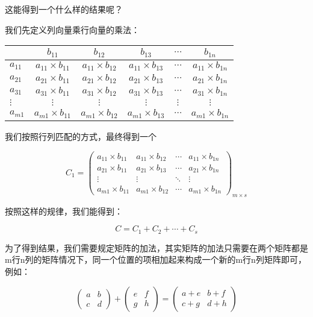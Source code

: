 \documentclass[12.8pt,a4paper,numbering = AMSalpha]{book}
\begin{document}
这能得到一个什么样的结果呢？

我们先定义列向量乘行向量的乘法：

\begin{center}
	\begin{tabular}{|l|c|c|c|c|c|}
		\hline
		\textbf{} & \textbf{$b_{11}$} & \textbf{$b_{12}$} & \textbf{$b_{13}$} & \textbf{$\cdots$} & \textbf{$b_{1n}$} \\
		\hline
		$a_{11}$ & $a_{11} \times b_{11}$ & $a_{11} \times b_{12}$ & $a_{11} \times b_{13}$ & $\cdots$ & $a_{11} \times b_{1n}$ \\
		$a_{21}$ & $a_{21} \times b_{11}$ & $a_{21} \times b_{12}$ & $a_{21} \times b_{13}$ & $\cdots$ & $a_{21} \times b_{1n}$ \\
		$a_{31}$ & $a_{31} \times b_{11}$ & $a_{31} \times b_{12}$ & $a_{31} \times b_{13}$ & $\cdots$ & $a_{31} \times b_{1n}$ \\
		$\vdots$ & $\vdots$ & $\vdots$ & $\vdots$ & $\vdots$ & $\vdots$ \\
		$a_{m1}$ & $a_{m1} \times b_{11}$ & $a_{m1} \times b_{12}$ & $a_{m1} \times b_{13}$ & $\cdots$ & $a_{m1} \times b_{1n}$ \\
		\hline
	\end{tabular}
\end{center}

我们按照行列匹配的方式，最终得到一个

\[
C_{1}=\begin{pmatrix}
	a_{11} \times b_{11} & a_{11} \times b_{12} & \cdots & a_{11} \times b_{1n} \\
	a_{21} \times b_{11} & a_{21} \times b_{13} & \cdots & a_{21} \times b_{1n} \\
	\vdots & \vdots & \ddots & \vdots\\
	a_{m1} \times b_{11} & a_{m1} \times b_{12} & \cdots & a_{m1} \times b_{1n}
\end{pmatrix}_{m\times s}
\]

按照这样的规律，我们能得到：

\[C=C_1+C_2+\cdots+C_s\]

为了得到结果，我们需要规定矩阵的加法，其实矩阵的加法只需要在两个矩阵都是m行n列的矩阵情况下，同一个位置的项相加起来构成一个新的m行n列矩阵即可，例如：

\[
\begin{pmatrix}
	a&b\\
	c&d
\end{pmatrix}
+
\begin{pmatrix}
	e&f\\
	g&h
\end{pmatrix}
=
\begin{pmatrix}
	a+e&b+f\\
	c+g&d+h
\end{pmatrix}
\]
\end{document}
